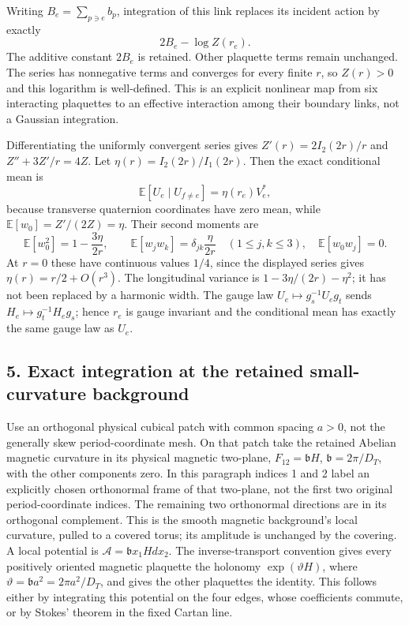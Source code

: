 \documentclass[
  11pt,
]{article}
\begin{document}
Writing \(B_e=\sum_{p\ni e}b_p\), integration of this link replaces its
incident action by exactly \[
 2B_e-\log Z(r_e).
\] The additive constant \(2B_e\) is retained. Other plaquette terms
remain unchanged. The series has nonnegative terms and converges for
every finite \(r\), so \(Z(r)>0\) and this logarithm is well-defined.
This is an explicit nonlinear map from six interacting plaquettes to an
effective interaction among their boundary links, not a Gaussian
integration.

Differentiating the uniformly convergent series gives
\(Z'(r)=2I_2(2r)/r\) and \(Z''+3Z'/r=4Z\). Let
\(\eta(r)=I_2(2r)/I_1(2r)\). Then the exact conditional mean is \[
 \mathbb E[U_e\mid U_{f\ne e}]=\eta(r_e)V_e^*,
\] because transverse quaternion coordinates have zero mean, while
\(\mathbb E[w_0]=Z'/(2Z)=\eta\). Their second moments are \[
 \mathbb E[w_0^2]=1-\frac{3\eta}{2r},\qquad
 \mathbb E[w_jw_k]=\delta_{jk}\frac{\eta}{2r}\quad(1\leq j,k\leq3),
 \quad \mathbb E[w_0w_j]=0.
\] At \(r=0\) these have continuous values \(1/4\), since the displayed
series gives \(\eta(r)=r/2+O(r^3)\). The longitudinal variance is
\(1-3\eta/(2r)-\eta^2\); it has not been replaced by a harmonic width.
The gauge law \(U_e\mapsto g_s^{-1}U_eg_t\) sends
\(H_e\mapsto g_t^{-1}H_eg_s\); hence \(r_e\) is gauge invariant and the
conditional mean has exactly the same gauge law as \(U_e\).

\subsection{5. Exact integration at the retained small-curvature
background}\label{exact-integration-at-the-retained-small-curvature-background}

Use an orthogonal physical cubical patch with common spacing \(a>0\),
not the generally skew period-coordinate mesh. On that patch take the
retained Abelian magnetic curvature in its physical magnetic two-plane,
\(F_{12}=\mathfrak bH\), \(\mathfrak b=2\pi/D_T\), with the other
components zero. In this paragraph indices 1 and 2 label an explicitly
chosen orthonormal frame of that two-plane, not the first two original
period-coordinate indices. The remaining two orthonormal directions are
in its orthogonal complement. This is the smooth magnetic background's
local curvature, pulled to a covered torus; its amplitude is unchanged
by the covering. A local potential is
\(\mathscr A=\mathfrak b x_1Hdx_2\). The inverse-transport convention
gives every positively oriented magnetic plaquette the holonomy
\(\exp(\vartheta H)\), where \(\vartheta=\mathfrak b a^2=2\pi a^2/D_T\),
and gives the other plaquettes the identity. This follows either by
integrating this potential on the four edges, whose coefficients
commute, or by Stokes' theorem in the fixed Cartan line.
\end{document}
